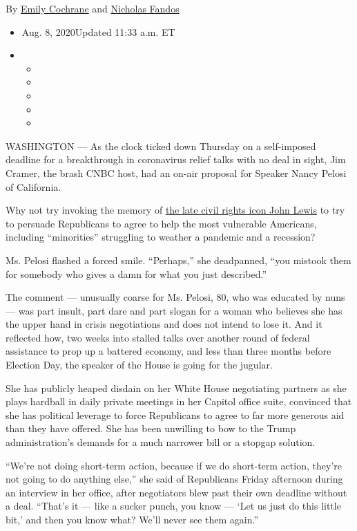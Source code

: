 By \href{https://www.nytimes.com/by/emily-cochrane}{Emily Cochrane} and
\href{https://www.nytimes.com/by/nicholas-fandos}{Nicholas Fandos}

\begin{itemize}
\item
  Aug. 8, 2020Updated 11:33 a.m. ET
\item
  \begin{itemize}
  \item
  \item
  \item
  \item
  \item
  \end{itemize}
\end{itemize}

WASHINGTON --- As the clock ticked down Thursday on a self-imposed
deadline for a breakthrough in coronavirus relief talks with no deal in
sight, Jim Cramer, the brash CNBC host, had an on-air proposal for
Speaker Nancy Pelosi of California.

Why not try invoking the memory of
\href{https://www.nytimes.com/2020/07/17/us/john-lewis-dead.html}{the
late civil rights icon John Lewis} to try to persuade Republicans to
agree to help the most vulnerable Americans, including ``minorities''
struggling to weather a pandemic and a recession?

Ms. Pelosi flashed a forced smile. ``Perhaps,'' she deadpanned, ``you
mistook them for somebody who gives a damn for what you just
described.''

The comment --- unusually coarse for Ms. Pelosi, 80, who was educated by
nuns --- was part insult, part dare and part slogan for a woman who
believes she has the upper hand in crisis negotiations and does not
intend to lose it. And it reflected how, two weeks into stalled talks
over another round of federal assistance to prop up a battered economy,
and less than three months before Election Day, the speaker of the House
is going for the jugular.

She has publicly heaped disdain on her White House negotiating partners
as she plays hardball in daily private meetings in her Capitol office
suite, convinced that she has political leverage to force Republicans to
agree to far more generous aid than they have offered. She has been
unwilling to bow to the Trump administration's demands for a much
narrower bill or a stopgap solution.

``We're not doing short-term action, because if we do short-term action,
they're not going to do anything else,'' she said of Republicans Friday
afternoon during an interview in her office, after negotiators blew past
their own deadline without a deal. ``That's it --- like a sucker punch,
you know --- `Let us just do this little bit,' and then you know what?
We'll never see them again.''

